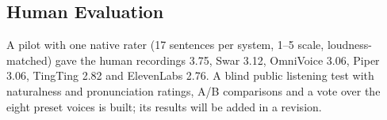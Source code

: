 \subsection{Human Evaluation}
A pilot with one native rater (17 sentences per system, 1--5 scale, loudness-matched) gave the human recordings 3.75, Swar 3.12, OmniVoice 3.06, Piper 3.06, TingTing 2.82 and ElevenLabs 2.76. A blind public listening test with naturalness and pronunciation ratings, A/B comparisons and a vote over the eight preset voices is built; its results will be added in a revision.

